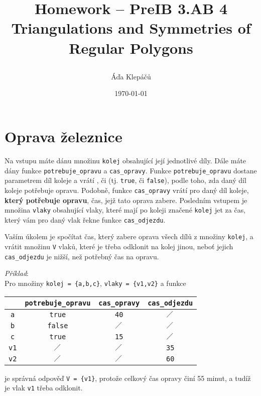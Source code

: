 \documentclass[a4paper,11pt]{article}
\title{\Huge\textsf{Homework -- PreIB 3.AB 4}\\
 \Large\textsf{Triangulations and Symmetries of Regular Polygons}
 \author{Áďa Klepáčů}
 \date{\today}
}
\begin{document}
\thispagestyle{fancy}

\section*{Oprava železnice}

Na vstupu máte dánu množinu \texttt{kolej} obsahující její jednotlivé díly. Dále
máte dány funkce \texttt{potrebuje\_opravu} a \texttt{cas\_opravy}. Funkce
\texttt{potrebuje\_opravu} dostane parametrem díl koleje a vrátí , či
 (tj. \texttt{true}, či \texttt{false}), podle toho, zda daný díl koleje
potřebuje opravu. Podobně, funkce \texttt{cas\_opravy} vrátí pro daný díl
koleje, \textbf{který potřebuje opravu}, čas, jejž tato oprava zabere. Posledním
vstupem je množina \texttt{vlaky} obsahující vlaky, které mají po koleji značené
\texttt{kolej} jet za čas, který vám pro daný vlak řekne funkce
\texttt{cas\_odjezdu}.

Vaším úkolem je spočítat čas, který zabere oprava všech dílů z množiny
\texttt{kolej}, a vrátit množinu \texttt{V} vlaků, které je třeba odklonit na
kolej jinou, neboť jejich \texttt{cas\_odjezdu} je nižší, než potřebný čas na
opravu.

\emph{Příklad}:\\
Pro množiny \texttt{kolej = \{a,b,c\}}, \texttt{vlaky = \{v1,v2\}} a funkce
\begin{center}
 \begin{tabular}{c|c|c|c}
  & \texttt{potrebuje\_opravu} & \texttt{cas\_opravy} & \texttt{cas\_odjezdu}\\
  \toprule
  \texttt{a} & \texttt{true} & \texttt{40} & $\diagup$ \\
  \midrule
  \texttt{b} & \texttt{false} & $\diagup$ & $\diagup$\\
  \midrule
  \texttt{c} & \texttt{true} & \texttt{15} & $\diagup$\\
  \midrule
  \texttt{v1} & $\diagup$ & $\diagup$ & \texttt{35}\\
  \midrule
  \texttt{v2} & $\diagup$ & $\diagup$ & \texttt{60}
 \end{tabular}
\end{center}
je správná odpověď \texttt{V = \{v1\}}, protože celkový čas opravy činí 55
minut, a tudíž je vlak \texttt{v1} třeba odklonit.
\end{document}
